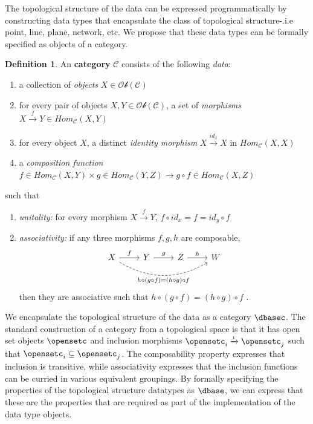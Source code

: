 \documentclass[10pt,journal,compsoc]{IEEEtran}
\theoremstyle{definition}
\newtheorem{definition}{Definition}[section]
\theoremstyle{remark}
\begin{document}
The topological structure of the data can be expressed programmatically by constructing data types that encapsulate the class of topological structure-.i.e point, line, plane, network, etc. We propose that these data types can be formally specified as objects of a category. 
\begin{definition} 
   An \textbf{category} $\mathcal{C}$ consists of the following \textit{data}: 
\begin{enumerate}
  \item a collection of \textit{objects} $X \in \mathcal{Ob}(\mathcal{C})$
  \item for every pair of objects $X, Y \in \mathcal{Ob}(\mathcal{C})$, a set of \textit{morphisms} $X \xrightarrow{f} Y \in Hom_{\mathcal{C}}(X, Y)$
  \item for every object $X$, a distinct \textit{identity morphism} $X \xrightarrow {id_x} X$ in $Hom_{\mathcal{C}}(X, X)$
  \item a \textit{composition function} $f \in Hom_{\mathcal{C}}(X, Y) \times  g \in Hom_{\mathcal{C}}(Y, Z) \rightarrow g \circ f \in Hom_{\mathcal{C}}(X, Z)$
\end{enumerate}
such that 
\begin{enumerate}
  \item \textit{unitality:} for every morphism $ X \xrightarrow{f} Y$, $f \circ id_x = f = id_y \circ f$
  \item \textit{associativity:} if any three morphisms $f, g, h$ are composable, 
    \begin{equation*}
      \begin{tikzcd}
        X \arrow[r, "f"] \arrow[rrr, "h\circ(g\circ f) = (h\circ g)\circ f"', bend right, dashed] & Y  \arrow[r, "g"] & Z \arrow[r, "h"] & W
        \end{tikzcd}
  \end{equation*}
  then they are associative such that $h\circ(g\circ f) = (h \circ g) \circ f$  \cite{lawvere2009conceptual,riehlCategoryTheoryContext,maclaneCategoriesWorkingMathematician2013,fongInvitationAppliedCategory2019}. 
  \end{enumerate}
\end{definition}
We encapsulate the topological structure of the data as a category $\mathcal{\dbasec}$. The standard construction of a category from a topological space is that it has open set objects $\opensetc$ and inclusion morphisms $\opensetc_i \xrightarrow{\iota} \opensetc_j$ such that $\opensetc_i \subseteq \opensetc_j$\cite{riehlCategoryTheoryContext}. The composability property expresses that inclusion is transitive, while associativity expresses that the inclusion functions can be curried in various equivalent groupings. By formally specifying the properties of the topological structure datatypes as $\mathcal{\dbase}$, we can express that these are the properties that are required as part of the implementation of the data type objects.  
\end{document}
